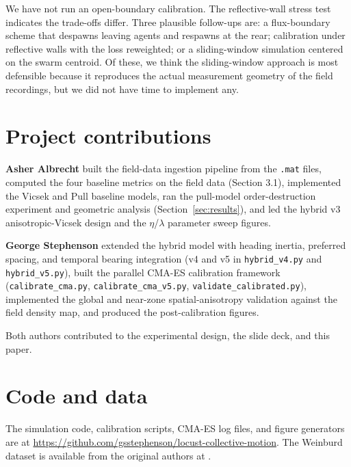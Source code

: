 \documentclass[11pt]{article}
\begin{document}
We have not run an open-boundary calibration. The reflective-wall
stress test indicates the trade-offs differ. Three plausible follow-ups
are: a flux-boundary scheme that despawns leaving agents and respawns at
the rear; calibration under reflective walls with the loss reweighted;
or a sliding-window simulation centered on the swarm centroid. Of
these, we think the sliding-window approach is most defensible because
it reproduces the actual measurement geometry of the
\citet{weinburd2024} field recordings, but we did not have time to
implement any.

\section{Project contributions}

\textbf{Asher Albrecht} built the field-data ingestion pipeline from the
\citet{weinburd2024} \texttt{.mat} files, computed the four baseline
metrics on the field data (Section 3.1), implemented the Vicsek and Pull
baseline models, ran the pull-model order-destruction experiment and
geometric analysis (Section~\ref{sec:results}), and led the hybrid v3
anisotropic-Vicsek design and the $\eta$/$\lambda$ parameter sweep
figures.

\textbf{George Stephenson} extended the hybrid model with heading inertia,
preferred spacing, and temporal bearing integration (v4 and v5 in
\texttt{hybrid\_v4.py} and \texttt{hybrid\_v5.py}), built the parallel
CMA-ES calibration framework (\texttt{calibrate\_cma.py},
\texttt{calibrate\_cma\_v5.py}, \texttt{validate\_calibrated.py}),
implemented the global and near-zone spatial-anisotropy validation
against the field density map, and produced the post-calibration
figures.

Both authors contributed to the experimental design, the slide deck,
and this paper.

\section*{Code and data}

The simulation code, calibration scripts, CMA-ES log files, and figure
generators are at \url{https://github.com/gsstephenson/locust-collective-motion}.
The Weinburd dataset is available from the original authors at
\citet{weinburd2024}.



\end{document}
